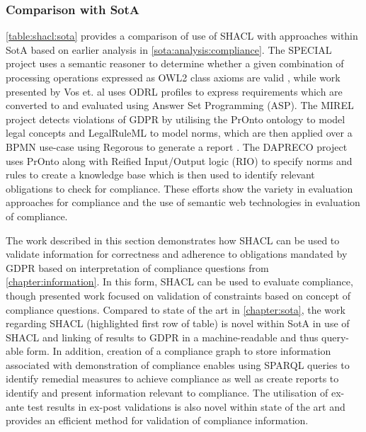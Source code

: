 \subsubsection*{Comparison with SotA}
\autoref{table:shacl:sota} provides a comparison of use of SHACL with approaches within SotA based on earlier analysis in \autoref{sota:analysis:compliance}.
The SPECIAL project uses a semantic reasoner to determine whether a given combination of processing operations expressed as OWL2 class axioms are valid \cite{westphal_spirit_2018}, while work presented by Vos et. al \cite{vos_odrl_2019} uses ODRL profiles to express requirements which are converted to and evaluated using Answer Set Programming (ASP).
The MIREL project detects violations of GDPR by utilising the PrOnto ontology \cite{palmirani_pronto_2018,palmirani_pronto_2018-1,monica_modelling_2018} to model legal concepts and LegalRuleML to model norms, which are then applied over a BPMN use-case using Regorous to generate a report \cite{monica_modelling_2018}.
The DAPRECO project uses PrOnto along with Reified Input/Output logic (RIO) \cite{robaldo_reified_2017} to specify norms and rules to create a knowledge base \cite{bartolini_agile_2019} which is then used to identify relevant obligations to check for compliance.
These efforts show the variety in evaluation approaches for compliance and the use of semantic web technologies in evaluation of compliance.

The work described in this section demonstrates how SHACL can be used to validate information for correctness and adherence to obligations mandated by GDPR based on interpretation of compliance questions from \autoref{chapter:information}. In this form, SHACL can be used to evaluate compliance, though presented work focused on validation of constraints based on concept of compliance questions.
Compared to state of the art in \autoref{chapter:sota}, the work regarding SHACL (highlighted first row of table) is novel within SotA in use of SHACL and linking of results to GDPR in a machine-readable and thus query-able form.
In addition, creation of a compliance graph to store information associated with demonstration of compliance enables using SPARQL queries to identify remedial measures to achieve compliance as well as create reports to identify and present information relevant to compliance.
The utilisation of ex-ante test results in ex-post validations is also novel within state of the art and provides an efficient method for validation of compliance information.

